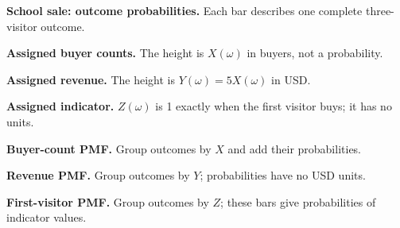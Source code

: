 \par\noindent \begin{minipage}[t]{.485\linewidth}
\centering
{}
\par\small \textbf{School sale: outcome probabilities.} Each bar describes one complete three-visitor outcome.
\end{minipage}\hfill\begin{minipage}[t]{.485\linewidth}
\centering
{}
\par\small \textbf{Assigned buyer counts.} The height is $X(\omega)$ in buyers, not a probability.
\end{minipage}\par\medskip
\par\noindent \begin{minipage}[t]{.485\linewidth}
\centering
{}
\par\small \textbf{Assigned revenue.} The height is $Y(\omega)=5X(\omega)$ in USD.
\end{minipage}\hfill\begin{minipage}[t]{.485\linewidth}
\centering
{}
\par\small \textbf{Assigned indicator.} $Z(\omega)$ is 1 exactly when the first visitor buys; it has no units.
\end{minipage}\par\medskip
\par\noindent \begin{minipage}[t]{.32\linewidth}
\centering
{}
\par\small \textbf{Buyer-count PMF.} Group outcomes by $X$ and add their probabilities.
\end{minipage}\hfill\begin{minipage}[t]{.32\linewidth}
\centering
{}
\par\small \textbf{Revenue PMF.} Group outcomes by $Y$; probabilities have no USD units.
\end{minipage}\hfill\begin{minipage}[t]{.32\linewidth}
\centering
{}
\par\small \textbf{First-visitor PMF.} Group outcomes by $Z$; these bars give probabilities of indicator values.
\end{minipage}\par\medskip


